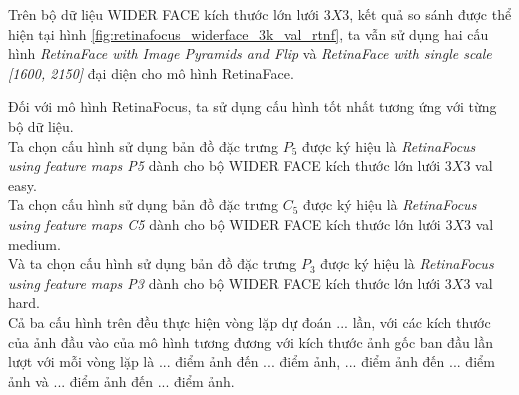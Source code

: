 {    \noindent
    Trên bộ dữ liệu WIDER FACE kích thước lớn lưới $3 X 3$, kết quả so sánh được thể hiện tại hình \ref{fig:retinafocus_widerface_3k_val_rtnf}, ta vẫn sử dụng hai cấu hình \textit{RetinaFace with Image Pyramids and Flip} và \textit{RetinaFace with single scale [1600, 2150]} đại diện cho mô hình RetinaFace.

    \noindent
    Đối với mô hình RetinaFocus, ta sử dụng cấu hình tốt nhất tương ứng với từng bộ dữ liệu. \\
    Ta chọn cấu hình sử dụng bản đồ đặc trưng $P_5$ được ký hiệu là \textit{RetinaFocus using feature maps P5} dành cho bộ WIDER FACE kích thước lớn lưới $3 X 3$ val easy. \\
    Ta chọn cấu hình sử dụng bản đồ đặc trưng $C_5$ được ký hiệu là \textit{RetinaFocus using feature maps C5} dành cho bộ WIDER FACE kích thước lớn lưới $3 X 3$ val medium. \\
    Và ta chọn cấu hình sử dụng bản đồ đặc trưng $P_3$ được ký hiệu là \textit{RetinaFocus using feature maps P3} dành cho bộ WIDER FACE kích thước lớn lưới $3 X 3$ val hard. \\
    Cả ba cấu hình trên đều thực hiện vòng lặp dự đoán ... lần, với các kích thước của ảnh đầu vào của mô hình tương đương với kích thước ảnh gốc ban đầu lần lượt với mỗi vòng lặp là ... điểm ảnh đến ... điểm ảnh, ... điểm ảnh đến ... điểm ảnh và ... điểm ảnh đến ... điểm ảnh.

}
